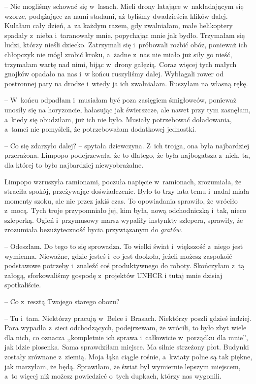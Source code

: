 \documentclass[oneside,polish,11pt,sfheadings]{mwbk}
\begin{document}
-- Nie mogliśmy schować się w~lasach. Mieli drony latające w~nakładającym
się wzorze, podążające za nami stadami, aż byliśmy dwadzieścia klików dalej.
Kulałam cały dzień, a~za każdym razem, gdy zwalniałam, małe helikoptery
spadały z~nieba i~taranowały mnie, popychając mnie jak bydło. Trzymałam
się ludzi, którzy nieśli dziecko. Zatrzymali się i~próbowali rozbić
obóz, ponieważ ich chłopczyk nie mógł zrobić kroku, a~żadne z~nas nie
miało już siły go nieść, trzymałam wartę nad nimi, bijąc w~drony
gałęzią. Coraz więcej tych małych gnojków opadało na nas i~w końcu
ruszyliśmy dalej. Wybłagali rower od postronnej pary na drodze i~wtedy
ja ich zwalniałam. Ruszyłam na własną rękę.

-- W~końcu odpadłam i~musiałam być poza zasięgiem śmigłowców, ponieważ
unosiły się na horyzoncie, hałasując jak świerszcze, ale nawet przy tym
zasnęłam, a~kiedy się obudziłam, już ich nie było. Musiały potrzebować
doładowania, a~tamci nie pomyśleli, że potrzebowałam dodatkowej
jednostki.

-- Co się zdarzyło dalej? -- spytała dziewczyna. Z~ich trojga, ona była
najbardziej przerażona. Limpopo podejrzewała, że to dlatego, że była
najbogatsza z~nich, ta, dla której to było najbardziej niewyobrażalne.

Limpopo wzruszyła ramionami, poczuła napięcie w~ramionach, zrozumiała,
że straciła spokój, przeżywając doświadczenie. Było to trzy lata temu i~nadal miała momenty szoku, ale nie przez jakiś czas. To opowiadania
sprawiło, że wróciło z~mocą. Tych troje przypomniało jej, kim była, nową
odchodniczką i~tak, nieco szleperką. Ogień i~przymusowy marsz wypaliły
instynkty szlepera, sprawiły, że zrozumiała bezużyteczność bycia
przywiązanym do \textit{gratów}.

-- Odeszłam. Do tego to się sprowadza. To wielki świat i~większość z~niego jest wymienna. Nieważne, gdzie jesteś i~co jest dookoła, jeżeli
możesz zaspokoić podstawowe potrzeby i~znaleźć coś produktywnego do
roboty. Skończyłam z~tą załogą, sforkowaliśmy gospodę z~projektów UNHCR
i tutaj mnie dzisiaj spotkaliście.

-- Co z~resztą Twojego starego obozu?

-- Tu i~tam. Niektórzy pracują w~Belce i~Brasach. Niektórzy poszli gdzieś
indziej. Para wypadła z~sieci odchodzących, podejrzewam, że wrócili, to
było zbyt wiele dla nich, co oznacza ,,kompletnie ich sprawa i~całkowicie w~porządku dla mnie'', jak idzie piosenka. Sama sprawdziłam
miejsce. Ma silnie strzeżony płot. Budynki zostały zrównane z~ziemią.
Moja łąka ciągle rośnie, a~kwiaty polne są tak piękne, jak marzyłam, że
będą. Sprawiłam, że świat był wymiernie lepszym miejscem, a~to więcej
niż możesz powiedzieć o~tych dupkach, którzy nas wygonili.
\end{document}
